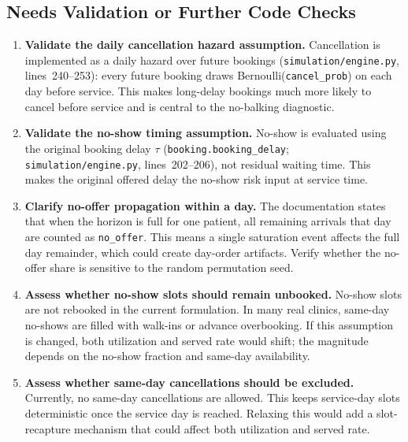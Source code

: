 \documentclass[11pt]{article}
\begin{document}
\subsection{Needs Validation or Further Code Checks}

\vspace{6pt}
\begin{checkenv}
\begin{enumerate}[leftmargin=1.5em, itemsep=4pt]
\item \textbf{Validate the daily cancellation hazard assumption.}
Cancellation is implemented as a daily hazard over future bookings
(\texttt{simulation/engine.py}, lines~240--253): every future booking draws
Bernoulli(\texttt{cancel\_prob}) on each day before service. This makes
long-delay bookings much more likely to cancel before service and is central
to the no-balking diagnostic.

\item \textbf{Validate the no-show timing assumption.}
No-show is evaluated using the original booking delay $\tau$
(\texttt{booking.booking\_delay}; \texttt{simulation/engine.py},
lines~202--206), not residual waiting time. This makes the original offered
delay the no-show risk input at service time.

\item \textbf{Clarify no-offer propagation within a day.}
The documentation states that when the horizon is full for one patient,
all remaining arrivals that day are counted as \texttt{no\_offer}. This
means a single saturation event affects the full day remainder, which
could create day-order artifacts. Verify whether the no-offer share is
sensitive to the random permutation seed.

\item \textbf{Assess whether no-show slots should remain unbooked.}
No-show slots are not rebooked in the current formulation. In many
real clinics, same-day no-shows are filled with walk-ins or advance
overbooking. If this assumption is changed, both utilization and served
rate would shift; the magnitude depends on the no-show fraction and
same-day availability.

\item \textbf{Assess whether same-day cancellations should be excluded.}
Currently, no same-day cancellations are allowed. This keeps service-day
slots deterministic once the service day is reached. Relaxing this would
add a slot-recapture mechanism that could affect both utilization and
served rate.


\end{enumerate}
\end{checkenv}
\end{document}
